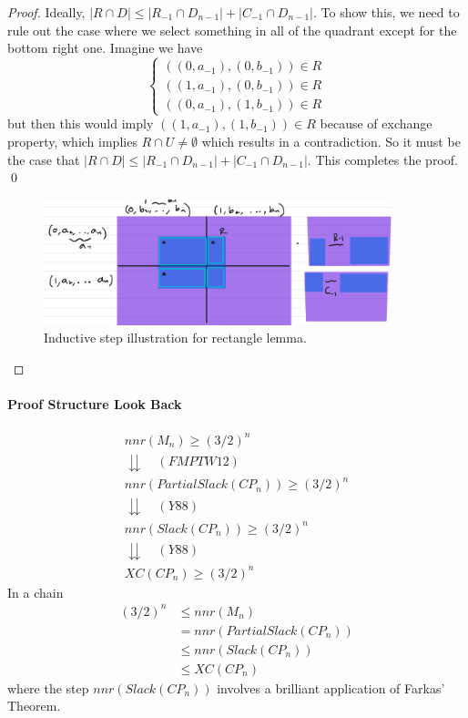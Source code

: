 \begin{proof}
	Ideally, $|R \cap D| \leq |R_{-1} \cap D_{n - 1} | + |C_{-1} \cap D_{n - 1}|$. To show this, we need to rule out the case where we select something in all of the quadrant except for the bottom right one. Imagine we have 
	\begin{equation}
		\begin{cases}
			((0, a_{-1}), (0, b_{-1})) \in R \\
			((1, a_{-1}), (0, b_{-1})) \in R \\
			((0, a_{-1}), (1, b_{-1})) \in R
		\end{cases}
	\end{equation}
	but then this would imply $((1, a_{-1}), (1, b_{-1})) \in R$ because of exchange property, which implies $R\cap U \neq \emptyset$ which results in a contradiction. So it must be the case that $|R \cap D| \leq |R_{-1} \cap D_{n - 1} | + |C_{-1} \cap D_{n - 1}|$. This completes the proof. \qed
	
	\begin{figure}
		\center 
		\includegraphics[width=0.9\textwidth]{figs/rectanglelemma-is.png}
		\caption{Inductive step illustration for rectangle lemma.}
		\label{fig:rectanglelemma-is}
	\end{figure}
\end{proof}

\paragraph{Proof Structure Look Back} 
\begin{equation}
	\begin{matrix}
		nnr(M_n) \geq (3/2)^n \\
		\downdownarrows \quad (FMPTW12) \\
		nnr(PartialSlack(CP_n)) \geq (3/2)^n \\
		\downdownarrows \quad (Y88) \\
		nnr(Slack(CP_n)) \geq (3/2)^n \\
		\downdownarrows \quad (Y88) \\
		XC(CP_n) \geq (3/2)^n
	\end{matrix}
\end{equation}
In a chain
\begin{align}
	(3/2)^n 
	&\leq nnr(M_n) \\
	&= nnr(PartialSlack(CP_n)) \\
	&\leq nnr(Slack(CP_n)) \\
	&\leq XC(CP_n)
\end{align}
where the step $nnr(Slack(CP_n))$ involves a brilliant application of Farkas' Theorem. 



